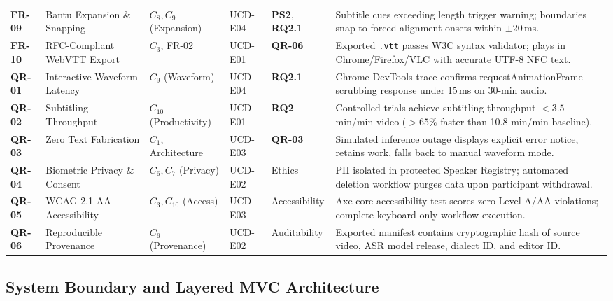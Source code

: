 \documentclass[conference]{IEEEtran}
\begin{document}
\begin{table}[t]
\begin{tabular}{p{1.2cm} p{3.2cm} p{1.6cm} p{1.5cm} p{1.8cm} >{\raggedright\arraybackslash}p{7.2cm}}
\addlinespace
\textbf{FR-09} & Bantu Expansion \& Snapping & $C_8, C_9$ (Expansion) & UCD-E04 & \textbf{PS2}, \textbf{RQ2.1} & Subtitle cues exceeding length trigger warning; boundaries snap to forced-alignment onsets within $\pm 20$\,ms. \\
\addlinespace
\textbf{FR-10} & RFC-Compliant WebVTT Export & $C_3$, FR-02 & UCD-E01 & \textbf{QR-06} & Exported \texttt{.vtt} passes W3C syntax validator; plays in Chrome/Firefox/VLC with accurate UTF-8 NFC text. \\
\midrule
\textbf{QR-01} & Interactive Waveform Latency & $C_9$ (Waveform) & UCD-E04 & \textbf{RQ2.1} & Chrome DevTools trace confirms requestAnimationFrame scrubbing response under 15\,ms on 30-min audio. \\
\addlinespace
\textbf{QR-02} & Subtitling Throughput & $C_{10}$ (Productivity) & UCD-E01 & \textbf{RQ2} & Controlled trials achieve subtitling throughput $<3.5$ min/min video ($>65\%$ faster than 10.8 min/min baseline). \\
\addlinespace
\textbf{QR-03} & Zero Text Fabrication & $C_1$, Architecture & UCD-E03 & \textbf{QR-03} & Simulated inference outage displays explicit error notice, retains work, falls back to manual waveform mode. \\
\addlinespace
\textbf{QR-04} & Biometric Privacy \& Consent & $C_6, C_7$ (Privacy) & UCD-E02 & Ethics & PII isolated in protected Speaker Registry; automated deletion workflow purges data upon participant withdrawal. \\
\addlinespace
\textbf{QR-05} & WCAG 2.1 AA Accessibility & $C_3, C_{10}$ (Access) & UCD-E03 & Accessibility & Axe-core accessibility test scores zero Level A/AA violations; complete keyboard-only workflow execution. \\
\addlinespace
\textbf{QR-06} & Reproducible Provenance & $C_6$ (Provenance) & UCD-E02 & Auditability & Exported manifest contains cryptographic hash of source video, ASR model release, dialect ID, and editor ID. \\
\bottomrule
\end{tabular}
\end{table}

\subsection{System Boundary and Layered MVC Architecture}
\label{sec:design:architecture}
\end{document}

